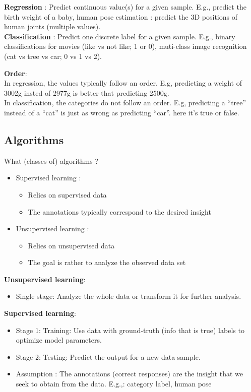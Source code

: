\textbf{Regression} : Predict continuous value(s) for a given sample. E.g., predict the birth weight of a baby, human pose estimation : predict the 3D positions of human joints (multiple values). \\ 
\textbf{Classification} : Predict one discrete label for a given sample. E.g., binary classifications for movies (like vs not like; 1 or 0), muti-class image recognition (cat vs tree vs car; 0 vs 1 vs 2).

\textbf{Order}: \\ 
In regression, the values typically follow an order. E.g, predicting a weight of 3002g insted of 2977g is better that predicting 2500g. \\ 
In classification, the categories do not follow an order. E.g, predicting a ``tree'' instead of a ``cat'' is just as wrong as predicting ``car''. \textrightarrow here it's true or false.

\subsection{Algorithms}%
\label{sub:Algorithms}
What (classes of) algorithms ?
\begin{itemize}
  \item Supervised learning : \begin{itemize}
    \item Relies on supervised data
    \item The annotations typically correspond to the desired insight
  \end{itemize}
\item Unsupervised learning : \begin{itemize}
  \item Relies on unsupervised data
  \item The goal is rather to analyze the observed data set 
\end{itemize}
\end{itemize}

\textbf{Unsupervised learning}:
\begin{itemize}
  \item Single stage: Analyze the whole data or transform it for further analysis.
\end{itemize}

\textbf{Supervised learning}:
\begin{itemize}
  \item Stage 1: Training: Use data with ground-truth (info that is true) labels to optimize model parameters.
  \item Stage 2: Testing: Predict the output for a new data sample.
  \item Assumption : The annotations (correct responses) are the insight that we seek to obtain from the data. E.g.,: category label, human pose
\end{itemize}

